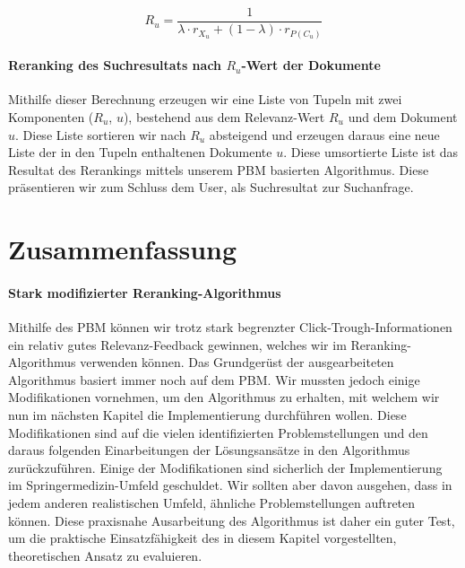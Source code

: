 \vspace{-1em}
\begin{equation}
	R_{u} = \frac{1}{\lambda\cdot r_{X_{u}} + (1 - \lambda)\cdot r_{P(C_{u})}}
\end{equation}
\vspace{-1em}

\pagebreak

\paragraph{Reranking des Suchresultats nach $R_{u}$-Wert der Dokumente}
Mithilfe dieser Berechnung erzeugen wir eine Liste von Tupeln mit zwei Komponenten ($R_{u}$, $u$), bestehend aus dem Relevanz-Wert $R_{u}$ und dem Dokument $u$. Diese Liste sortieren wir nach $R_{u}$ absteigend und erzeugen daraus eine neue Liste der in den Tupeln enthaltenen Dokumente $u$. Diese umsortierte Liste ist das Resultat des Rerankings mittels unserem PBM basierten Algorithmus. Diese präsentieren wir zum Schluss dem User, als Suchresultat zur Suchanfrage. 


\section{Zusammenfassung}
\label{sec:Reranking:Zusammenfassung}

\paragraph{Stark modifizierter Reranking-Algorithmus}
Mithilfe des PBM können wir trotz stark begrenzter Click-Trough-Informationen ein relativ gutes Relevanz-Feedback gewinnen, welches wir im Reranking-Algorithmus verwenden können. Das Grundgerüst der ausgearbeiteten Algorithmus basiert immer noch auf dem PBM. Wir mussten jedoch einige Modifikationen vornehmen, um den Algorithmus zu erhalten, mit welchem wir nun im nächsten Kapitel die Implementierung durchführen wollen. Diese Modifikationen sind auf die vielen identifizierten Problemstellungen und den daraus folgenden Einarbeitungen der Lösungsansätze in den Algorithmus zurückzuführen. Einige der Modifikationen sind sicherlich der Implementierung im Springermedizin-Umfeld geschuldet. Wir sollten aber davon ausgehen, dass in jedem anderen realistischen Umfeld, ähnliche Problemstellungen auftreten können. Diese praxisnahe Ausarbeitung des Algorithmus ist daher ein guter Test, um die praktische Einsatzfähigkeit des in diesem Kapitel vorgestellten, theoretischen Ansatz zu evaluieren. 

